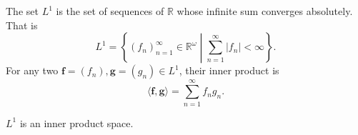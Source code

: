 \begin{definition}[$L^1$]
    The set $L^1$ is the set of sequences of $\mathbb{R}$ whose infinite sum converges absolutely.
    That is
    \begin{equation*}
        L^1 = \left\{ (f_n)_{n=1}^{\infty} \in \mathbb{R}^{\omega} \middle| \sum_{n=1}^{\infty} \lvert f_n \rvert < \infty \right\}.
    \end{equation*}
    For any two $\mathbf{f} = (f_n), \mathbf{g} = (g_n) \in L^1$, their inner product is
    \begin{equation*}
        \langle \mathbf{f}, \mathbf{g} \rangle = \sum\limits_{n=1}^{\infty} f_ng_n.
    \end{equation*}
\end{definition}
\begin{proposition}
    $L^1$ is an inner product space.
\end{proposition}
